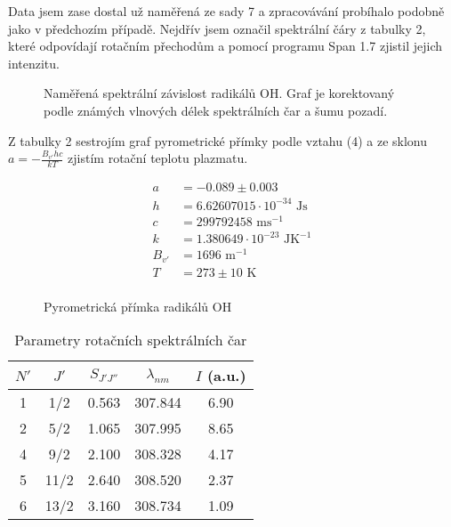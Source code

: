 \documentclass[a4paper,11pt]{article}
\begin{document}
Data jsem zase dostal už naměřená ze sady 7 a zpracovávání probíhalo podobně jako v předchozím případě. Nejdřív jsem označil spektrální čáry z tabulky 2, které odpovídají rotačním přechodům a pomocí programu Span 1.7 zjistil jejich intenzitu.

\begin{figure}[htpb]
    \centering
    \resizebox{0.8\textwidth}{!}{  }
    \vspace{40pt}
    \captionsetup{type=graph}
    \caption{Naměřená spektrální závislost radikálů OH. Graf je korektovaný podle známých vlnových délek spektrálních čar a šumu pozadí.}
\end{figure}

\begin{table}[htpb]
    \vspace{-20pt}
    \begin{minipage}[t]{.5\linewidth}
Z tabulky 2 sestrojím graf pyrometrické přímky podle vztahu (4) a ze sklonu $ a = -\frac{B_{v'} hc}{kT} $  zjistím rotační teplotu plazmatu. 


\begin{align*}
    a &= -0.089 \pm 0.003 \\
    h &= 6.62607015 \cdot 10^{-34} \text{ Js} \\
    c &= 299792458 \text{ ms}^{-1} \\
    k &= 1.380649 \cdot 10^{-23}  \text{ JK}^{-1} \\
    B_{v'} &= 1696 \text{ m}^{-1} \\
    T &= 273 \pm 10  \text{ K}\\
\end{align*}

    \end{minipage} 
    \hfill
    \begin{minipage}[t]{.5\linewidth}
        \centering

\begin{figure}[H]
    \vspace{-40pt}
    \centering
    
    \captionsetup{type=graph}
    \caption{Pyrometrická přímka radikálů OH}
\end{figure}


    \end{minipage} 
\end{table}

\begin{table}[htpb]
    \vspace{-30pt}
    \centering
    \begin{tabular}{c c c c c}
        $ N' $  & $ J' $  & $ S_{J'J''} $ & $ \lambda_{nm} $ & $ I $  (a.u.)   \\\hline
        1 & 1/2 & 0.563 & 307.844 & 6.90 \\
        2 & 5/2 & 1.065 & 307.995 & 8.65 \\
        4 & 9/2 & 2.100 & 308.328 & 4.17 \\
        5 & 11/2 & 2.640 & 308.520 & 2.37 \\
        6 & 13/2 & 3.160 & 308.734 & 1.09 \\
    \end{tabular}
    \caption{Parametry rotačních spektrálních čar}
\end{table}
\end{document}
